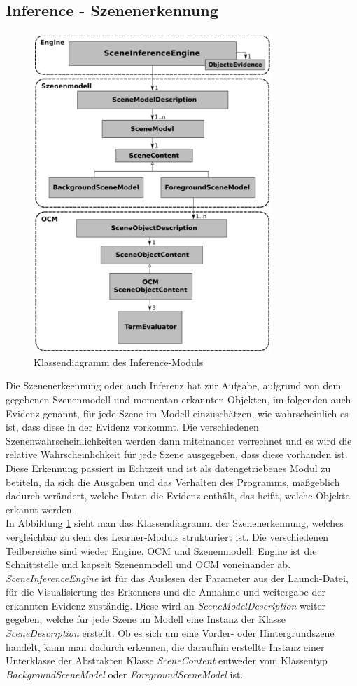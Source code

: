 \subsection{Inference - Szenenerkennung}\label{sub:inference}
\begin{figure}
	\centering
	\includegraphics[width=9cm]{bilder/InferenceClass.pdf}
	\caption{Klassendiagramm des Inference-Moduls \cite{gehrung14}}
	\label{img:inferenceclass}
\end{figure}
Die Szenenerkeennung oder auch Inferenz hat zur Aufgabe, aufgrund von dem gegebenen Szenenmodell und momentan erkannten Objekten, im folgenden auch Evidenz genannt, für jede Szene im Modell einzuschätzen, wie wahrscheinlich es ist, dass diese in der Evidenz vorkommt. Die verschiedenen Szenenwahrscheinlichkeiten werden dann miteinander verrechnet und es wird die relative Wahrscheinlichkeit für jede Szene ausgegeben, dass diese vorhanden ist. Diese Erkennung passiert in Echtzeit und ist als datengetriebenes Modul zu betiteln, da sich die Ausgaben und das Verhalten des Programms, maßgeblich dadurch verändert, welche Daten die Evidenz enthält, das heißt, welche Objekte erkannt werden.\cite{mehlhaus16}\smallskip\\
In Abbildung \ref{img:inferenceclass} sieht man das Klassendiagramm der Szenenerkennung, welches vergleichbar zu dem des Learner-Moduls strukturiert ist. Die verschiedenen Teilbereiche sind wieder Engine, OCM und Szenenmodell. Engine ist die Schnittstelle und kapselt Szenenmodell und OCM voneinander ab. \textit{SceneInferenceEngine} ist für das Auslesen der Parameter aus der Launch-Datei, für die Visualisierung des Erkenners und die Annahme und weitergabe der erkannten Evidenz zuständig. Diese wird an \textit{SceneModelDescription} weiter gegeben, welche für jede Szene im Modell eine Instanz der Klasse \textit{SceneDescription} erstellt. Ob es sich um eine Vorder- oder Hintergrundszene handelt, kann man dadurch erkennen, die daraufhin erstellte Instanz einer Unterklasse der Abstrakten Klasse \textit{SceneContent} entweder vom Klassentyp \textit{BackgroundSceneModel} oder \textit{ForegroundSceneModel} ist. \smallskip\\
